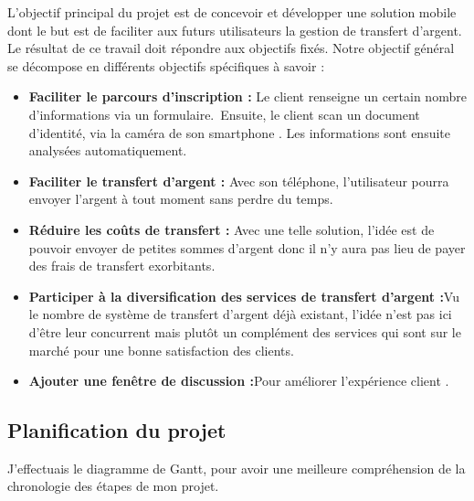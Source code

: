 L’objectif principal du projet est de concevoir et développer une solution mobile dont le but est
de faciliter aux futurs utilisateurs la gestion de transfert d’argent. Le résultat de ce travail doit répondre aux objectifs fixés.
Notre objectif général se décompose en différents objectifs spécifiques à savoir :
\begin{itemize}[label=$\ast$]
	\item \textbf{Faciliter le parcours d'inscription :} Le client renseigne un certain nombre d’informations via un formulaire. Ensuite, le client scan un document d’identité, via la caméra de son smartphone . Les informations sont ensuite analysées automatiquement.
	
	\item \textbf{Faciliter  le transfert d’argent :} Avec son téléphone, l’utilisateur pourra
	envoyer l'argent à tout moment sans perdre du temps.
	
	
	\item \textbf{Réduire  les coûts de transfert :} Avec une telle solution, l’idée est de
	pouvoir envoyer de petites sommes d’argent donc il n’y aura pas lieu de payer des frais de transfert  exorbitants.
	
	
	\item \textbf{Participer à la diversification des services de transfert d’argent :}Vu le nombre de
	système de transfert d’argent déjà existant, l’idée n’est pas ici d’être leur concurrent
	mais plutôt un complément des services qui sont sur le marché pour une bonne
	satisfaction des clients.
	
	
	\item \textbf{Ajouter une fenêtre de discussion  :}Pour améliorer l'expérience client .

\end{itemize}
\subsection{Planification du projet}
J'effectuais le diagramme de Gantt, pour avoir une meilleure compréhension de la chronologie des étapes de mon projet.
\newline
\newline

